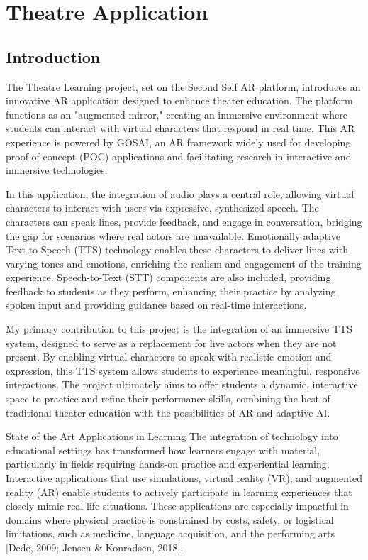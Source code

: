 \section{Theatre Application}

\subsection{Introduction}

The Theatre Learning project, set on the Second Self AR platform, introduces an innovative AR application designed to enhance theater education. The platform functions as an "augmented mirror," creating an immersive environment where students can interact with virtual characters that respond in real time. This AR experience is powered by GOSAI, an AR framework widely used for developing proof-of-concept (POC) applications and facilitating research in interactive and immersive technologies.

In this application, the integration of audio plays a central role, allowing virtual characters to interact with users via expressive, synthesized speech. The characters can speak lines, provide feedback, and engage in conversation, bridging the gap for scenarios where real actors are unavailable. Emotionally adaptive Text-to-Speech (TTS) technology enables these characters to deliver lines with varying tones and emotions, enriching the realism and engagement of the training experience. Speech-to-Text (STT) components are also included, providing feedback to students as they perform, enhancing their practice by analyzing spoken input and providing guidance based on real-time interactions.

My primary contribution to this project is the integration of an immersive TTS system, designed to serve as a replacement for live actors when they are not present. By enabling virtual characters to speak with realistic emotion and expression, this TTS system allows students to experience meaningful, responsive interactions. The project ultimately aims to offer students a dynamic, interactive space to practice and refine their performance skills, combining the best of traditional theater education with the possibilities of AR and adaptive AI.

State of the Art
Applications in Learning
The integration of technology into educational settings has transformed how learners engage with material, particularly in fields requiring hands-on practice and experiential learning. Interactive applications that use simulations, virtual reality (VR), and augmented reality (AR) enable students to actively participate in learning experiences that closely mimic real-life situations. These applications are especially impactful in domains where physical practice is constrained by costs, safety, or logistical limitations, such as medicine, language acquisition, and the performing arts [Dede, 2009; Jensen & Konradsen, 2018].

